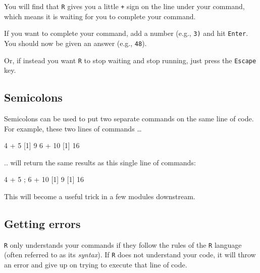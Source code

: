 \documentclass[
]{book}
\newenvironment{Shaded}{\begin{snugshade}}{\end{snugshade}}
\newcommand{\DecValTok}[1]{\textcolor[rgb]{0.00,0.00,0.81}{#1}}
\newcommand{\NormalTok}[1]{#1}
\newcommand{\SpecialCharTok}[1]{\textcolor[rgb]{0.00,0.00,0.00}{#1}}
\begin{document}
You will find that \texttt{R} gives you a little \texttt{+} sign on the line under your command, which means it is waiting for you to complete your command.

If you want to complete your command, add a number (e.g., \texttt{3)} and hit \texttt{Enter}. You should now be given an answer (e.g., \texttt{48}).

Or, if instead you want \texttt{R} to stop waiting and stop running, just press the \texttt{Escape} key.

\hypertarget{semicolons}{%
\subsection*{Semicolons}\label{semicolons}}

Semicolons can be used to put two separate commands on the same line of code. For example, these two lines of commands \ldots{}

\begin{Shaded}
\begin{Highlighting}[]
\DecValTok{4} \SpecialCharTok{+} \DecValTok{5}
\NormalTok{[}\DecValTok{1}\NormalTok{] }\DecValTok{9}
\DecValTok{6} \SpecialCharTok{+} \DecValTok{10}
\NormalTok{[}\DecValTok{1}\NormalTok{] }\DecValTok{16}
\end{Highlighting}
\end{Shaded}

.. will return the same results as this single line of commands:

\begin{Shaded}
\begin{Highlighting}[]
\DecValTok{4} \SpecialCharTok{+} \DecValTok{5}\NormalTok{ ; }\DecValTok{6} \SpecialCharTok{+} \DecValTok{10}
\NormalTok{[}\DecValTok{1}\NormalTok{] }\DecValTok{9}
\NormalTok{[}\DecValTok{1}\NormalTok{] }\DecValTok{16}
\end{Highlighting}
\end{Shaded}

This will become a useful trick in a few modules downstream.

\hypertarget{getting-errors}{%
\subsection*{Getting errors}\label{getting-errors}}

\texttt{R} only understands your commands if they follow the rules of the \texttt{R} language (often referred to as its \emph{syntax}). If \texttt{R} does not understand your code, it will throw an error and give up on trying to execute that line of code.
\end{document}
